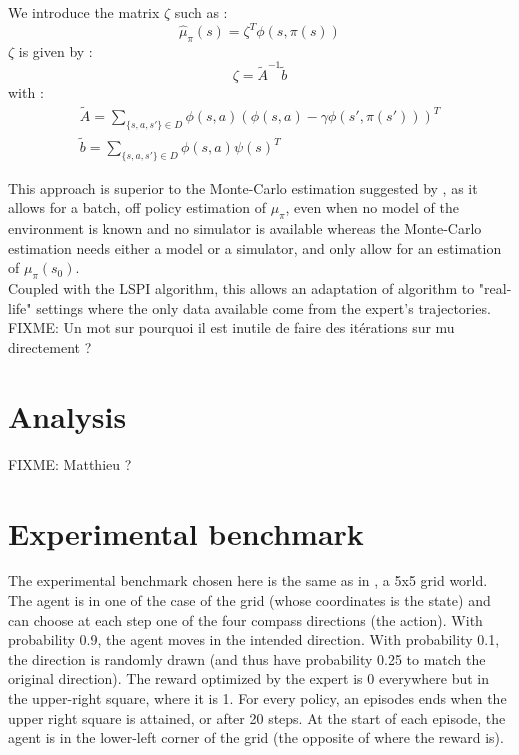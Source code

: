 \documentclass{article}
\begin{document}
We introduce the matrix $\zeta$ such as :
\begin{equation}
\hat \mu_\pi (s) = \zeta^T\phi(s,\pi(s))
\end{equation}
$\zeta$ is given by :
\begin{equation}
\zeta = \tilde A^{-1}\tilde b
\end{equation}
with :
\begin{eqnarray}
\tilde A = \sum_{\{s,a,s'\} \in D}\phi(s,a)\left(\phi(s,a) - \gamma \phi(s',\pi(s'))\right)^T\\
\tilde b = \sum_{\{s,a,s'\} \in D} \phi(s,a)\psi(s)^T
\end{eqnarray}

This approach is superior to the Monte-Carlo estimation suggested by \citet{abbeel2004apprenticeship}, as it allows for a batch, off policy estimation of $\mu_\pi$, even when no model of the environment is known and no simulator is available whereas the Monte-Carlo estimation needs either a model or a simulator, and only allow for an estimation of $\mu_\pi(s_0)$.\\

Coupled with the LSPI algorithm, this allows an adaptation of \citet{abbeel2004apprenticeship} algorithm to "real-life" settings where the only data available come from the expert's trajectories.\\

FIXME: Un mot sur pourquoi il est inutile de faire des itérations sur mu directement ?

\section{Analysis}
FIXME: Matthieu ?
\section{Experimental benchmark}
\label{sec:exp}
The experimental benchmark chosen here is the same as in \citep{ng2000algorithms}, a 5x5 grid world. The agent is in one of the case of the grid (whose coordinates is the state) and can choose at each step one of the four compass directions (the action). With probability 0.9, the agent moves in the intended direction. With probability 0.1, the direction is randomly drawn (and thus have probability 0.25 to match the original direction). The reward optimized by the expert is 0 everywhere but in the upper-right square, where it is 1. For every policy, an episodes ends when the upper right square is attained, or after 20 steps. At the start of each episode, the agent is in the lower-left corner of the grid (the opposite of where the reward is).\\
\end{document}
